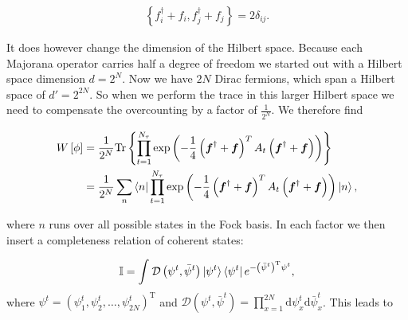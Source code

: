\documentclass{article}
\begin{document}
	\begin{align}
		\left\{f^\dagger_i + f_i, f^\dagger_j + f_j\right\} = 2\delta_{ij}.
	\end{align}
	
	It does however change the dimension of the Hilbert space. Because each Majorana operator carries half a degree of freedom we started out with a Hilbert space dimension $d = 2^N$. Now we have $2N$ Dirac fermions, which span a Hilbert space of $d' = 2^{2N}$. So when we perform the trace in this larger Hilbert space we need to compensate the overcounting by a factor of $\frac{1}{2^N}$. We therefore find
	
	\begin{align}
		W\left[ \phi \right] &= \frac{1}{2^N}\mathrm{Tr}\left\{\prod_{t = 1}^{N_\tau} \mathrm{exp}\left(-\frac{1}{4}\left(\boldsymbol{f}^\dagger + \boldsymbol{f}\right)^T A_t \left(\boldsymbol{f}^\dagger + \boldsymbol{f}\right)\right) \right\} \nonumber\\
		&= \frac{1}{2^N} \sum_n \bra{n}\prod_{t = 1}^{N_\tau} \mathrm{exp}\left(-\frac{1}{4}\left(\boldsymbol{f}^\dagger + \boldsymbol{f}\right)^T A_t \left(\boldsymbol{f}^\dagger + \boldsymbol{f}\right)\right)\ket{n},
	\end{align}
	
	where $n$ runs over all possible states in the Fock basis. In each factor we then insert a completeness relation of coherent states:
	
	\begin{align}
		\mathbb{I} = \int_{}^{ } \mathcal{D}\left({\psi}^t,\bar{\psi}^t\right) \ket{\psi^t} \bra{\psi^t} e^{-\left(\bar\psi^t\right)^\mathrm{T}   \psi^t},
	\end{align}
	where $\psi^t=\left(\psi^t_1, \psi^t_2, \dots, \psi^t_{2N}\right)^\mathrm{T}$ and $\mathcal{D}\left({\psi}^t, \bar{\psi}^t\right) = \prod_{x=1}^{2N}\mathrm{d} \psi^t_x \mathrm{d}  \bar{\psi}^t_x $. This leads to 
	
\end{document}
